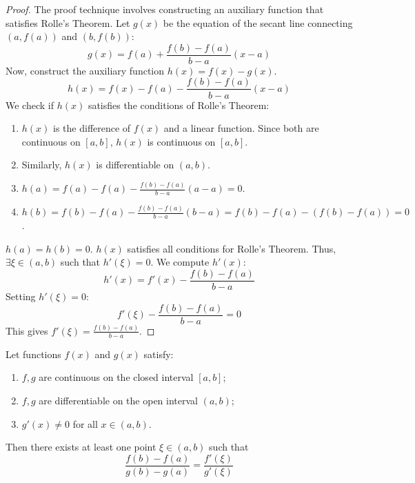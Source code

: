 \begin{proof}
The proof technique involves constructing an auxiliary function that satisfies Rolle's Theorem.
Let $g(x)$ be the equation of the secant line connecting $(a, f(a))$ and $(b, f(b))$:
\[
g(x) = f(a) + \frac{f(b) - f(a)}{b - a} (x - a)
\]
Now, construct the auxiliary function $h(x) = f(x) - g(x)$.
\[
h(x) = f(x) - f(a) - \frac{f(b) - f(a)}{b - a} (x - a)
\]
We check if $h(x)$ satisfies the conditions of Rolle's Theorem:
\begin{enumerate}
    \item $h(x)$ is the difference of $f(x)$ and a linear function. Since both are continuous on $[a, b]$, $h(x)$ is continuous on $[a, b]$.
    \item Similarly, $h(x)$ is differentiable on $(a, b)$.
    \item $h(a) = f(a) - f(a) - \frac{f(b) - f(a)}{b - a} (a - a) = 0$.
    \item $h(b) = f(b) - f(a) - \frac{f(b) - f(a)}{b - a} (b - a) = f(b) - f(a) - (f(b) - f(a)) = 0$.
\end{enumerate}
$h(a) = h(b) = 0$.
$h(x)$ satisfies all conditions for Rolle's Theorem. Thus, $\exists \xi \in (a, b)$ such that $h'(\xi) = 0$.
We compute $h'(x)$:
\[
h'(x) = f'(x) - \frac{f(b) - f(a)}{b - a}
\]
Setting $h'(\xi) = 0$:
\[
f'(\xi) - \frac{f(b) - f(a)}{b - a} = 0
\]
This gives $f'(\xi) = \frac{f(b) - f(a)}{b - a}$.
\end{proof}

\begin{theorem}
\label{thm:cauchy_mvt_en}
Let functions $f(x)$ and $g(x)$ satisfy:
\begin{enumerate}
    \item $f, g$ are continuous on the closed interval $[a, b]$;
    \item $f, g$ are differentiable on the open interval $(a, b)$;
    \item $g'(x) \neq 0$ for all $x \in (a, b)$.
\end{enumerate}
Then there exists at least one point $\xi \in (a, b)$ such that
\[
\frac{f(b) - f(a)}{g(b) - g(a)} = \frac{f'(\xi)}{g'(\xi)}
\]
\end{theorem}

